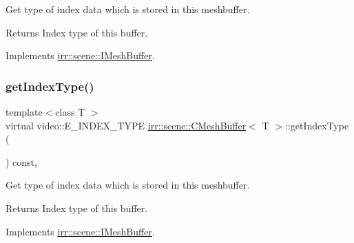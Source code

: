 Get type of index data which is stored in this meshbuffer. 

\begin{DoxyReturn}{Returns}
Index type of this buffer. 
\end{DoxyReturn}


Implements \hyperlink{classirr_1_1scene_1_1IMeshBuffer_a8a993431c2c35420b62a577dc18dbdc2}{irr\+::scene\+::\+I\+Mesh\+Buffer}.

\mbox{\label{classirr_1_1scene_1_1CMeshBuffer_aa183491690fa47b4697bbfcc7902301c}} 
\subsubsection{\texorpdfstring{get\+Index\+Type()}{getIndexType()}\hspace{0.1cm}{\footnotesize\ttfamily [2/2]}}
{\footnotesize\ttfamily template$<$class T $>$ \\
virtual video\+::\+E\+\_\+\+I\+N\+D\+E\+X\+\_\+\+T\+Y\+PE \hyperlink{classirr_1_1scene_1_1CMeshBuffer}{irr\+::scene\+::\+C\+Mesh\+Buffer}$<$ T $>$\+::get\+Index\+Type (\begin{DoxyParamCaption}{ }\end{DoxyParamCaption}) const\hspace{0.3cm}{\ttfamily [inline]}, {\ttfamily [virtual]}}



Get type of index data which is stored in this meshbuffer. 

\begin{DoxyReturn}{Returns}
Index type of this buffer. 
\end{DoxyReturn}


Implements \hyperlink{classirr_1_1scene_1_1IMeshBuffer_a8a993431c2c35420b62a577dc18dbdc2}{irr\+::scene\+::\+I\+Mesh\+Buffer}.

\mbox{\label{classirr_1_1scene_1_1CMeshBuffer_a23af7e8ffb2ba674d1dd4448cea288bf}} 
